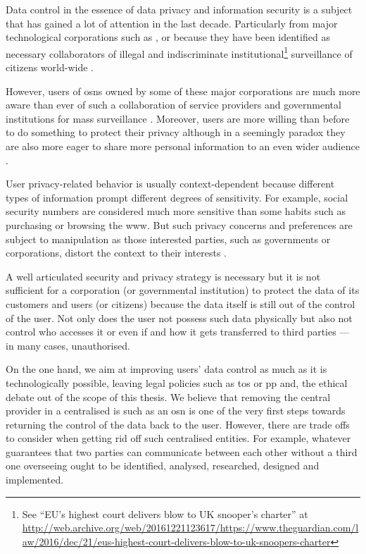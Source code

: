 Data control in the essence of data privacy and information security is a 
subject that has gained a lot of attention in the last decade. Particularly from 
major technological corporations such as \Google, \Apple or \Facebook because they 
have been identified as necessary collaborators of illegal and indiscriminate institutional\footnote{See 
``EU's highest court delivers blow to UK snooper's charter'' at \url{http://web.archive.org/web/20161221123617/https://www.theguardian.com/law/2016/dec/21/eus-highest-court-delivers-blow-to-uk-snoopers-charter}} 
surveillance of citizens world-wide \cite{Lyon14}.

However, users of \acp{osn} owned by some of these major corporations are much more 
aware than ever of such a collaboration of service providers and governmental institutions 
for mass surveillance \cite{Madden14}. Moreover, users are more willing than before 
to do something to protect their privacy although in a seemingly paradox they are 
also more eager to share more personal information to an even wider audience \cite{StutzmanGA13}. 

User privacy-related behavior is usually context-dependent because different types 
of information prompt different degrees of sensitivity. For example, social security 
numbers are considered much more sensitive than some habits such as purchasing or 
browsing the \ac{www}. But such privacy concerns and preferences are subject to 
manipulation as those interested parties, such as governments or corporations, distort 
the context to their interests \cite{AcquistiBL15}.

A well articulated security and privacy strategy is necessary but it is not sufficient 
for a corporation (or governmental institution) to protect the data of its customers 
and users (or citizens) because the data itself is still out of the control of the 
user. Not only does the user not possess such data physically but also not 
control who accesses it or even if and how it gets transferred to third parties --- 
in many cases, unauthorised.

On the one hand, we aim at improving users' data control as much as it is technologically 
possible, leaving legal policies such as \ac{tos} or \ac{pp} and, the ethical debate 
out of the scope of this thesis. We believe that removing the central provider in 
a centralised \ac{is} such as an \ac{osn} is one of the very first steps towards 
returning the control of the data back to the user. However, there are trade offs 
to consider when getting rid off such centralised entities. For example, whatever 
guarantees that two parties can communicate between each other without a third one 
overseeing ought to be identified, analysed, researched, designed and implemented.

